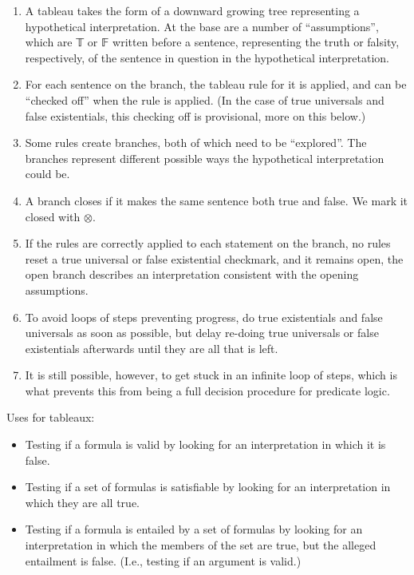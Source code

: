 \documentclass[12pt]{report}
\theoremstyle{nonumberplain}
\begin{document}
\begin{enumerate}
\item A tableau takes the form of a downward growing tree representing a hypothetical interpretation. At the base are a number of ``assumptions'', which are 𝕋 or 𝔽 written before a sentence, representing the truth or falsity, respectively, of the sentence in question in the hypothetical interpretation.
\item For each sentence on the branch, the tableau rule for it is applied, and can be ``checked off'' when the rule is applied. (In the case of true universals and false existentials, this checking off is provisional, more on this below.)
\item Some rules create branches, both of which need to be ``explored''. The branches represent different possible ways the hypothetical interpretation could be.
\item A branch closes if it makes the same sentence both true and false. We mark it closed with $\otimes$.
\item If the rules are correctly applied to each statement on the branch, no rules reset a true universal or false existential checkmark, and it remains open, the open branch describes an interpretation consistent with the opening assumptions.
\item To avoid loops of steps preventing progress, do true existentials and false universals as soon as possible, but delay re-doing true universals or false existentials afterwards until they are all that is left.
\item It is still possible, however, to get stuck in an infinite loop of steps, which is what prevents this from being a full decision procedure for predicate logic.
\end{enumerate}

\bigskip\noindent Uses for tableaux:
\begin{itemize}[noitemsep, leftmargin=*]
\item Testing if a formula is valid by looking for an interpretation in which it is false.
\item Testing if a set of formulas is satisfiable by looking for an interpretation in which they are all true.
\item Testing if a formula is entailed by a set of formulas by looking for an interpretation in which the members of the set are true, but the alleged entailment is false. (I.e., testing if an argument is valid.)
\end{itemize}
\end{document}
